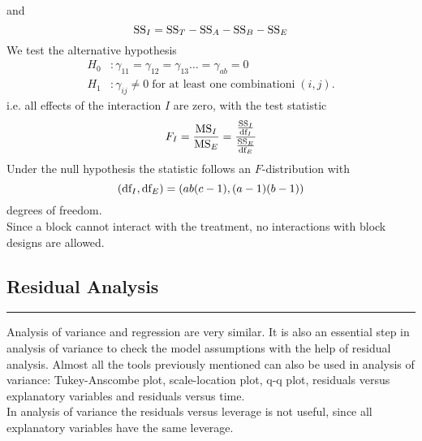 and
\begin{equation}
  \textup{SS}_I = \textup{SS}_T - \textup{SS}_A - \textup{SS}_B - \textup{SS}_E
\end{equation}
We test the alternative hypothesis
\begin{equation}
  \begin{split}
    H_0 &: \gamma_{11} = \gamma_{12} = \gamma_{13} \dots = \gamma_{ab} = 0\;\\
    H_1 &: \gamma_{ij} \neq 0 \;\text{for at least one combinationi}\;(i,j).
  \end{split}
\end{equation}
i.e. all effects of the interaction $I$ are zero, with the test statistic
\begin{equation}
  F_I = \frac{\textup{MS}_I}{\textup{MS}_E} = \frac{\frac{\textup{SS}_I}{\textup{df}_I}}{\frac{\textup{SS}_E}{\textup{df}_E}}
\end{equation}
Under the null hypothesis the statistic follows an $F$-distribution with
\begin{equation}
  (\textup{df}_I , \textup{df}_E) = (ab(c - 1),(a - 1)(b - 1))
\end{equation}
degrees of freedom.\\
Since a block cannot interact with the treatment, no interactions with block designs are allowed.\\

\subsection{Residual Analysis}
\noindent\rule[\linienAbstand]{\linewidth}{\linienDicke}
Analysis of variance and regression are very similar. It is also an essential step in analysis of variance to check the model assumptions with the help of residual analysis. Almost all the tools previously mentioned can also be used in analysis of variance: Tukey-Anscombe plot, scale-location plot, q-q plot, residuals versus explanatory variables and residuals versus time.\\
In analysis of variance the residuals versus leverage is not useful, since all explanatory variables
have the same leverage.

